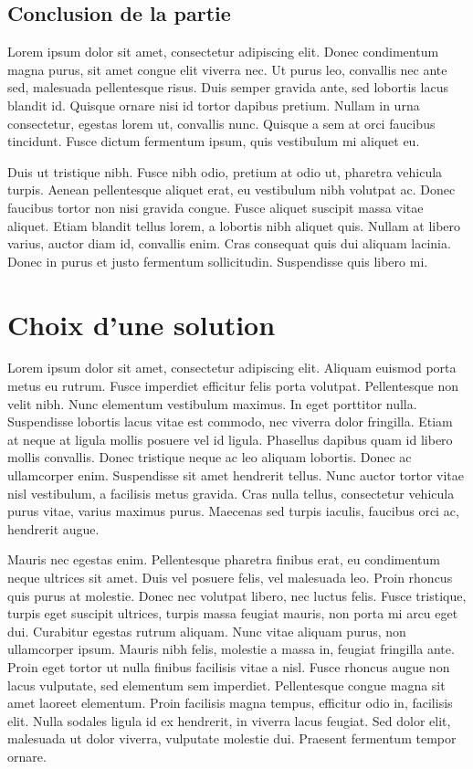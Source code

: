 \documentclass{report}
\begin{document}
\subsection{Conclusion de la partie}
Lorem ipsum dolor sit amet, consectetur adipiscing elit. Donec condimentum magna purus, sit amet congue elit viverra nec. Ut purus leo, convallis nec ante sed, malesuada pellentesque risus. Duis semper gravida ante, sed lobortis lacus blandit id. Quisque ornare nisi id tortor dapibus pretium. Nullam in urna consectetur, egestas lorem ut, convallis nunc. Quisque a sem at orci faucibus tincidunt. Fusce dictum fermentum ipsum, quis vestibulum mi aliquet eu.

Duis ut tristique nibh. Fusce nibh odio, pretium at odio ut, pharetra vehicula turpis. Aenean pellentesque aliquet erat, eu vestibulum nibh volutpat ac. Donec faucibus tortor non nisi gravida congue. Fusce aliquet suscipit massa vitae aliquet. Etiam blandit tellus lorem, a lobortis nibh aliquet quis. Nullam at libero varius, auctor diam id, convallis enim. Cras consequat quis dui aliquam lacinia. Donec in purus et justo fermentum sollicitudin. Suspendisse quis libero mi.

\section{Choix d'une solution}
Lorem ipsum dolor sit amet, consectetur adipiscing elit. Aliquam euismod porta metus eu rutrum. Fusce imperdiet efficitur felis porta volutpat. Pellentesque non velit nibh. Nunc elementum vestibulum maximus. In eget porttitor nulla. Suspendisse lobortis lacus vitae est commodo, nec viverra dolor fringilla. Etiam at neque at ligula mollis posuere vel id ligula. Phasellus dapibus quam id libero mollis convallis. Donec tristique neque ac leo aliquam lobortis. Donec ac ullamcorper enim. Suspendisse sit amet hendrerit tellus. Nunc auctor tortor vitae nisl vestibulum, a facilisis metus gravida. Cras nulla tellus, consectetur vehicula purus vitae, varius maximus purus. Maecenas sed turpis iaculis, faucibus orci ac, hendrerit augue.

Mauris nec egestas enim. Pellentesque pharetra finibus erat, eu condimentum neque ultrices sit amet. Duis vel posuere felis, vel malesuada leo. Proin rhoncus quis purus at molestie. Donec nec volutpat libero, nec luctus felis. Fusce tristique, turpis eget suscipit ultrices, turpis massa feugiat mauris, non porta mi arcu eget dui. Curabitur egestas rutrum aliquam. Nunc vitae aliquam purus, non ullamcorper ipsum. Mauris nibh felis, molestie a massa in, feugiat fringilla ante. Proin eget tortor ut nulla finibus facilisis vitae a nisl. Fusce rhoncus augue non lacus vulputate, sed elementum sem imperdiet. Pellentesque congue magna sit amet laoreet elementum. Proin facilisis magna tempus, efficitur odio in, facilisis elit. Nulla sodales ligula id ex hendrerit, in viverra lacus feugiat. Sed dolor elit, malesuada ut dolor viverra, vulputate molestie dui. Praesent fermentum tempor ornare.
\end{document}
